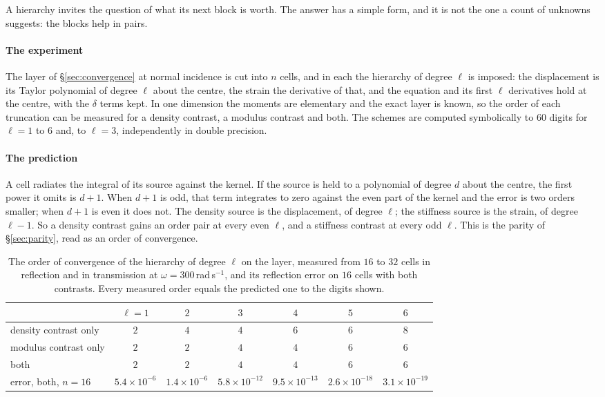 \documentclass[preprint,review,12pt]{elsarticle}
\begin{document}
A hierarchy invites the question of what its next block is worth. The answer has a simple form, and it
is not the one a count of unknowns suggests: the blocks help in pairs.

\paragraph{The experiment} The layer of \S\ref{sec:convergence} at normal incidence is cut into $n$
cells, and in each the hierarchy of degree $\ell$ is imposed: the displacement is its Taylor polynomial
of degree $\ell$ about the centre, the strain the derivative of that, and the equation and its first
$\ell$ derivatives hold at the centre, with the $\delta$ terms kept. In one dimension the moments are
elementary and the exact layer is known, so the order of each truncation can be measured for a density
contrast, a modulus contrast and both. The schemes are computed symbolically to $60$ digits for $\ell=1$ to $6$
and, to $\ell=3$, independently in double precision.

\paragraph{The prediction} A cell radiates the integral of its source against the kernel. If the
source is held to a polynomial of degree $d$ about the centre, the first power it omits is $d+1$. When
$d+1$ is odd, that term integrates to zero against the even part of the kernel and the error is two
orders smaller; when $d+1$ is even it does not. The density source is the displacement, of degree
$\ell$; the stiffness source is the strain, of degree $\ell-1$. So a density contrast gains an order
pair at every even $\ell$, and a stiffness contrast at every odd $\ell$. This is the parity of
\S\ref{sec:parity}, read as an order of convergence.

\begin{table}[htbp]
\centering
\caption{The order of convergence of the hierarchy of degree $\ell$ on the layer, measured from $16$ to
$32$ cells in reflection and in transmission at $\omega=300$\,rad\,s$^{-1}$, and its reflection error on
$16$ cells with both contrasts. Every measured order equals the predicted one to the digits
shown.}\label{tab:hierlayer}
\small
\begin{tabular}{@{}lcccccc@{}}
\toprule
 & $\ell=1$ & $2$ & $3$ & $4$ & $5$ & $6$ \\
\midrule
density contrast only & $2$ & $4$ & $4$ & $6$ & $6$ & $8$ \\
modulus contrast only & $2$ & $2$ & $4$ & $4$ & $6$ & $6$ \\
both & $2$ & $2$ & $4$ & $4$ & $6$ & $6$ \\
error, both, $n=16$ & $5.4\times10^{-6}$ & $1.4\times10^{-6}$ & $5.8\times10^{-12}$ & $9.5\times10^{-13}$
  & $2.6\times10^{-18}$ & $3.1\times10^{-19}$ \\
\bottomrule
\end{tabular}
\end{table}
\end{document}
